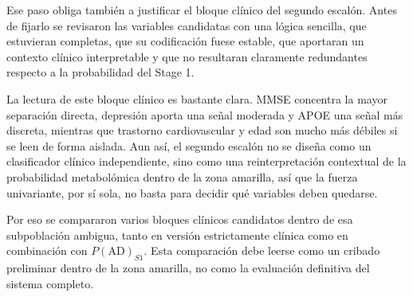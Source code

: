 Ese paso obliga también a justificar el bloque clínico del segundo escalón. Antes de fijarlo se revisaron las variables
candidatas con una lógica sencilla, que estuvieran completas, que su codificación fuese estable, que aportaran un
contexto clínico interpretable y que no resultaran claramente redundantes respecto a la probabilidad del Stage 1.

\begin{table}[ht]
\centering
\caption{Resumen descriptivo de las variables clínicas candidatas para el Stage 2. En las variables binarias, la media equivale a la proporción observada en cada grupo.}
\label{tab:stage2_candidate_eda}
\small
\setlength{\tabcolsep}{4pt}
\end{table}

La lectura de este bloque clínico es bastante clara. MMSE concentra la mayor separación directa, depresión aporta una
señal moderada y APOE una señal más discreta, mientras que trastorno cardiovascular y edad son mucho más débiles si se leen de forma
aislada. Aun así, el segundo escalón no se diseña como un clasificador clínico independiente, sino como una
reinterpretación contextual de la probabilidad metabolómica dentro de la zona amarilla, así que la fuerza univariante,
por sí sola, no basta para decidir qué variables deben quedarse.

Por eso se compararon varios bloques clínicos candidatos dentro de esa subpoblación ambigua, tanto en versión
estrictamente clínica como en combinación con $P(\text{AD})_{S1}$. Esta comparación debe leerse como un cribado
preliminar dentro de la zona amarilla, no como la evaluación definitiva del sistema completo.

